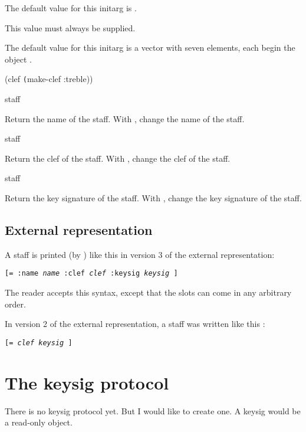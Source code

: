 The default value for this initarg is . 


This value must always be supplied. 


The default value for this initarg is a vector with seven elements,
each begin the object .

 {\optional (clef \texttt(make-clef :treble))}

 {staff}

Return the name of the staff.  With , change the name of
the staff.

 {staff}

Return the clef of the staff.  With , change the clef of
the staff.

 {staff}

Return the key signature of the staff.  With , change
the key signature of the staff. 

\subsection{External representation}

A staff is printed (by ) like this in version 3
of the external representation:

\texttt{[= :name \textit{name} :clef \textit{clef} :keysig \textit{keysig} ]}

The reader accepts this syntax, except that the slots can come in any
arbitrary order. 

In version 2 of the external representation, a staff was written like
this :

\texttt{[= \textit{clef} \textit{keysig} ]}

\section{The keysig protocol}

There is no keysig protocol yet.  But I would like to create one.  A
keysig would be a read-only object.  

